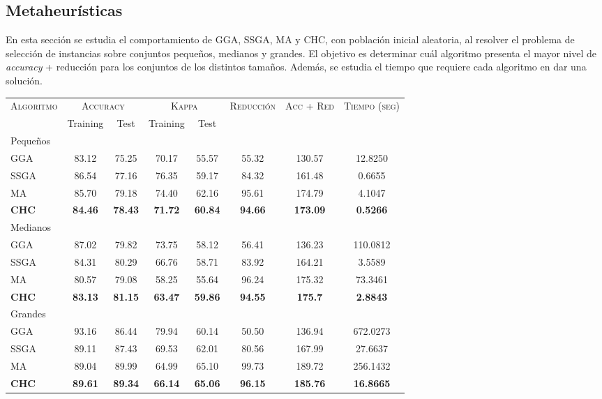\subsection{Metaheurísticas}

En esta sección se estudia el comportamiento de GGA, SSGA, MA y CHC, con población inicial aleatoria, al resolver el problema de selección de instancias sobre conjuntos pequeños, medianos y grandes. El objetivo es determinar cuál algoritmo presenta el mayor nivel de \emph{accuracy} + reducción para los conjuntos de los distintos tamaños. Además, se estudia el tiempo que requiere cada algoritmo en dar una solución.


\begin{table}[h!]
\centering
\begin{adjustbox}{max width =\textwidth}
\begin{tabular}{l c c c c c c c}
\hline
\multirow{2}{*}{\textsc{Algoritmo}}
	& \multicolumn{2}{c}{\textsc{Accuracy}}
	& \multicolumn{2}{c}{\textsc{Kappa}}
	& \textsc{Reducción}
	& \textsc{Acc + Red}
	& \textsc{Tiempo (seg)} \\
	& Training & Test
	& Training & Test \\ 
\hline
\hline

Pequeños\\
GGA  & 83.12 & 75.25 & 70.17 & 55.57 & 55.32 & 130.57 & 12.8250 \\
SSGA & 86.54 & 77.16 & 76.35 & 59.17 & 84.32 & 161.48 & 0.6655 \\
MA   & 85.70 & 79.18 & 74.40 & 62.16 & 95.61 & 174.79 & 4.1047 \\
\textbf{CHC}  & \textbf{84.46} & \textbf{78.43} & \textbf{71.72} & \textbf{60.84} & \textbf{94.66} & \textbf{173.09} & \textbf{0.5266} \\

\hline

Medianos\\
GGA  & 87.02 & 79.82 & 73.75 & 58.12 & 56.41 & 136.23 & 110.0812 \\
SSGA & 84.31 & 80.29 & 66.76 & 58.71 & 83.92 & 164.21 & 3.5589 \\
MA   & 80.57 & 79.08 & 58.25 & 55.64 & 96.24 & 175.32 & 73.3461 \\
\textbf{CHC}  & \textbf{83.13} & \textbf{81.15} & \textbf{63.47} & \textbf{59.86} & \textbf{94.55} & \textbf{175.7}  & \textbf{2.8843} \\

\hline
Grandes\\
GGA  & 93.16 & 86.44 & 79.94 & 60.14 & 50.50 & 136.94 & 672.0273 \\
SSGA & 89.11 & 87.43 & 69.53 & 62.01 & 80.56 & 167.99 & 27.6637 \\
MA   & 89.04 & 89.99 & 64.99 & 65.10 & 99.73 & 189.72 & 256.1432 \\
\textbf{CHC}  & \textbf{89.61} & \textbf{89.34} & \textbf{66.14} & \textbf{65.06} & \textbf{96.15} & \textbf{185.76} & \textbf{16.8665} \\


\end{tabular}
\end{adjustbox}
\end{table}

